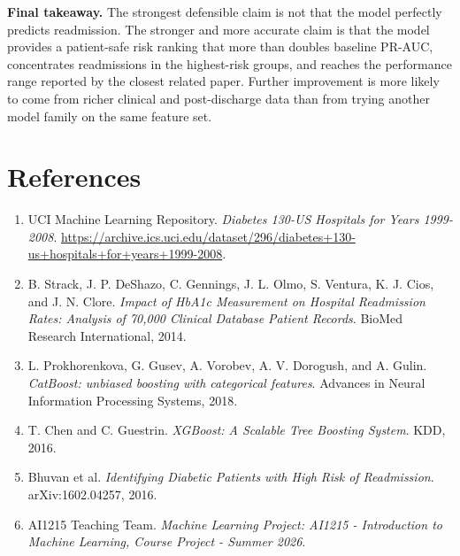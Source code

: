 \documentclass[10pt]{article}
\begin{document}
\textbf{Final takeaway.} The strongest defensible claim is not that the model perfectly predicts readmission. The stronger and more accurate claim is that the model provides a patient-safe risk ranking that more than doubles baseline PR-AUC, concentrates readmissions in the highest-risk groups, and reaches the performance range reported by the closest related paper. Further improvement is more likely to come from richer clinical and post-discharge data than from trying another model family on the same feature set.

\newpage
\section*{References}

\begin{enumerate}[leftmargin=1.4em, itemsep=3pt]
    \item UCI Machine Learning Repository. \textit{Diabetes 130-US Hospitals for Years 1999-2008}. \url{https://archive.ics.uci.edu/dataset/296/diabetes+130-us+hospitals+for+years+1999-2008}.
    \item B. Strack, J. P. DeShazo, C. Gennings, J. L. Olmo, S. Ventura, K. J. Cios, and J. N. Clore. \textit{Impact of HbA1c Measurement on Hospital Readmission Rates: Analysis of 70,000 Clinical Database Patient Records}. BioMed Research International, 2014.
    \item L. Prokhorenkova, G. Gusev, A. Vorobev, A. V. Dorogush, and A. Gulin. \textit{CatBoost: unbiased boosting with categorical features}. Advances in Neural Information Processing Systems, 2018.
    \item T. Chen and C. Guestrin. \textit{XGBoost: A Scalable Tree Boosting System}. KDD, 2016.
    \item Bhuvan et al. \textit{Identifying Diabetic Patients with High Risk of Readmission}. arXiv:1602.04257, 2016.
    \item AI1215 Teaching Team. \textit{Machine Learning Project: AI1215 - Introduction to Machine Learning, Course Project - Summer 2026}.
\end{enumerate}
\end{document}
